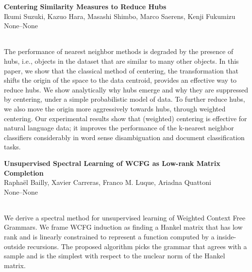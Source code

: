 \documentclass[twoside,makeidx]{book}
\renewcommand{\normalsize}{\fontsize{8}{9}\selectfont}
\renewcommand{\small}{\fontsize{7}{8}\selectfont}
\begin{document}
\par\vspace{2em}\noindent%
\begin{minipage}{\linewidth}%
\begin{center}
\textbf{\normalsize Centering Similarity Measures to Reduce Hubs}\\
\normalsize  Ikumi Suzuki,  Kazuo Hara,  Masashi Shimbo,  Marco Saerens,  Kenji Fukumizu\\
{\small None--None}\\
\end{center}
\end{minipage}\\[0.5em]
\nopagebreak%
\noindent%
{\small The performance of nearest neighbor methods is degraded by the presence of hubs, i.e., objects in the dataset that are similar to many other objects. In this paper, we show that the classical method of centering, the transformation that shifts the origin of the space to the data centroid, provides an effective way to reduce hubs. We show analytically why hubs emerge and why they are suppressed by centering, under a simple probabilistic model of data. To further reduce hubs, we also move the origin more aggressively towards hubs, through weighted centering. Our experimental results show that (weighted) centering  is effective for natural language data; it improves the performance of the k-nearest neighbor classifiers considerably in word sense disambiguation and document classification tasks.}
\par\vspace{2em}\noindent%
\begin{minipage}{\linewidth}%
\begin{center}
\textbf{\normalsize Unsupervised Spectral Learning of WCFG as Low-rank Matrix Completion}\\
\normalsize  Rapha\"{e}l Bailly,  Xavier Carreras,  Franco M. Luque,  Ariadna Quattoni\\
{\small None--None}\\
\end{center}
\end{minipage}\\[0.5em]
\nopagebreak%
\noindent%
{\small We derive a spectral method for unsupervised learning of Weighted Context Free Grammars. We frame WCFG induction as finding a Hankel matrix that has low rank and is linearly constrained to represent a function computed by a inside-outside recursions. The proposed algorithm picks the grammar that agrees with a sample and is the simplest with respect to the nuclear norm of the Hankel matrix.}
\end{document}
